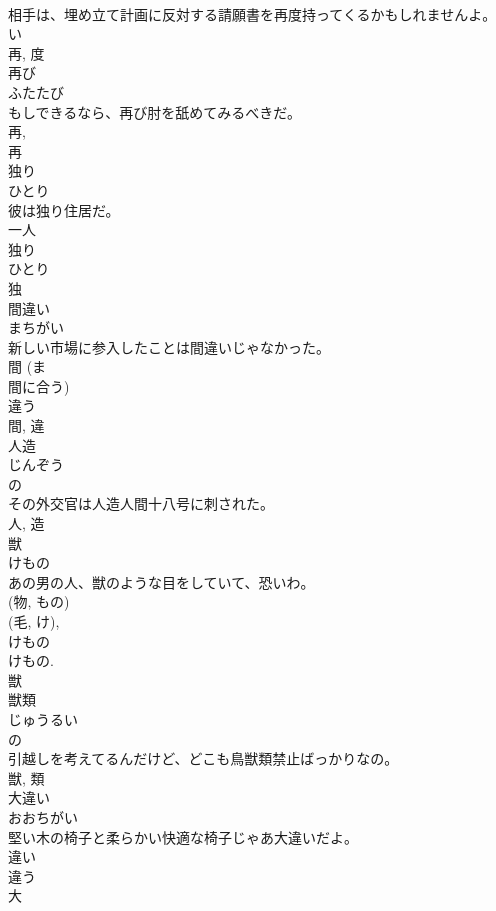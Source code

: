 \documentclass[8pt]{extreport}
\begin{document}
\begin{CJK}{UTF8}{min}
\\	相手は、埋め立て計画に反対する請願書を再度持ってくるかもしれませんよ。	
\\	い 
\\	再, 度	
\\	再び	
\\	ふたたび	
\\	もしできるなら、再び肘を舐めてみるべきだ。	
\\	再, 
\\	再	
\\	独り	
\\	ひとり	
\\	彼は独り住居だ。	
\\	一人 
\\	独り 
\\	ひとり 
\\	独	
\\	間違い	
\\	まちがい	
\\	新しい市場に参入したことは間違いじゃなかった。	
\\	間 (ま 
\\	間に合う) 
\\	違う 
\\	間, 違	
\\	人造	
\\	じんぞう	
\\	の 
\\	その外交官は人造人間十八号に刺された。	
\\	人, 造	
\\	獣	
\\	けもの	
\\	あの男の人、獣のような目をしていて、恐いわ。	
\\	(物, もの) 
\\	(毛, け), 
\\	けもの 
\\	けもの. 
\\	獣	
\\	獣類	
\\	じゅうるい	
\\	の 
\\	引越しを考えてるんだけど、どこも鳥獣類禁止ばっかりなの。	
\\	獣, 類	
\\	大違い	
\\	おおちがい	
\\	堅い木の椅子と柔らかい快適な椅子じゃあ大違いだよ。	
\\	違い 
\\	違う 
\\	大 

\end{CJK}
\end{document}
